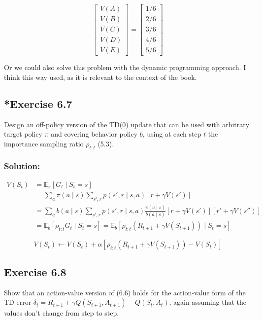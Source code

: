 \[
    \begin{bmatrix}
        V(A) \\
        V(B) \\
        V(C) \\
        V(D) \\
        V(E) 
    \end{bmatrix}
    =
    \begin{bmatrix}
        1/6 \\
        2/6 \\
        3/6 \\
        4/6 \\
        5/6
    \end{bmatrix}
\]

Or we could also solve this problem with the dynamic programming approach. I think this way used, as it is relevant to the context of the book.

\subsection*{*Exercise 6.7}
Design an off-policy version of the TD(0) update that can be used with
arbitrary target policy $\pi$ and covering behavior policy $b$, using at each step $t$ the importance
sampling ratio $\rho_{t:t}$ (5.3).

\subsubsection*{Solution:}

\begin{align*}
    V(S_t) &= \mathbb{E}_\pi[G_t \mid S_t = s] \\
    &= \sum_{a} \pi(a \mid s) \sum_{s', r} p(s', r \mid s, a) \left[ r + \gamma V(s') \right] = \\
    &= \sum_{a} b(a \mid s) \sum_{s', r} p(s', r \mid s, a) \frac{\pi(a \mid s)}{b(a \mid s)} \left[ r + \gamma V(s') \right] \left[ r' + \gamma V(s'') \right] \\
    &= \mathbb{E}_b[\rho_{t:t} G_t \mid S_t = s] = \mathbb{E}_b[\rho_{t:t} (R_{t+1} + \gamma V(S_{t+1})) \mid S_t = s]
\end{align*}


\[
V(S_t) \leftarrow V(S_t) + \alpha  \left[ \rho_{t:t}(R_{t+1} + \gamma V(S_{t+1})) - V(S_t) \right]
\]

\subsection*{Exercise 6.8}
Show that an action-value version of (6.6) holds for the action-value form
of the TD error  $\delta_t = R_{t+1} + \gamma Q(S_{t+1}, A_{t+1}) - Q(S_t, A_t)$, again assuming that the values
don't change from step to step. 

